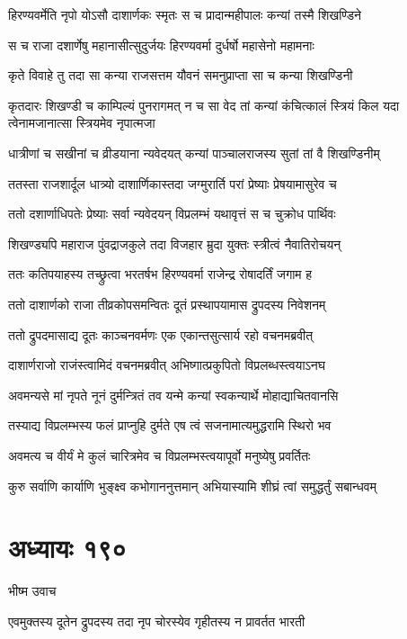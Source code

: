 \twolineshloka
{हिरण्यवर्मेति नृपो योऽसौ दाशार्णकः स्मृतः}
{स च प्रादान्महीपालः कन्यां तस्मै शिखण्डिने}


\twolineshloka
{स च राजा दशार्णेषु महानासीत्सुदुर्जयः}
{हिरण्यवर्मा दुर्धर्षो महासेनो महामनाः}


\twolineshloka
{कृते विवाहे तु तदा सा कन्या राजसत्तम}
{यौवनं समनुप्राप्ता सा च कन्या शिखण्डिनी}


\threelineshloka
{कृतदारः शिखण्डी च काम्पिल्यं पुनरागमत्}
{न च सा वेद तां कन्यां कंचित्कालं स्त्रियं किल}
{यदा त्वेनामजानात्सा स्त्रियमेव नृपात्मजा}


\twolineshloka
{धात्रीणां च सखीनां च व्रीडयाना न्यवेदयत्}
{कन्यां पाञ्चालराजस्य सुतां तां वै शिखण्डिनीम्}


\twolineshloka
{ततस्ता राजशार्दूल धात्र्यो दाशार्णिकास्तदा}
{जग्मुरार्ति परां प्रेष्याः प्रेषयामासुरेव च}


\twolineshloka
{ततो दशार्णाधिपतेः प्रेष्याः सर्वा न्यवेदयन्}
{विप्रलम्भं यथावृत्तं स च चुक्रोध पार्थिवः}


\twolineshloka
{शिखण्ड्यपि महाराज पुंवद्राजकुले तदा}
{विजहार म्रुदा युक्तः स्त्रीत्वं नैवातिरोचयन्}


\twolineshloka
{ततः कतिपयाहस्य तच्छ्रुत्वा भरतर्षभ}
{हिरण्यवर्मा राजेन्द्र रोषादर्तिं जगाम ह}


\twolineshloka
{ततो दाशार्णको राजा तीव्रकोपसमन्वितः}
{दूतं प्रस्थापयामास द्रुपदस्य निवेशनम्}


\twolineshloka
{ततो द्रुपदमासाद्य दूतः काञ्चनवर्मणः}
{एक एकान्तसुत्सार्य रहो वचनमब्रवीत्}


\twolineshloka
{दाशार्णराजो राजंस्त्वामिदं वचनमब्रवीत्}
{अभिष्गात्प्रकुपितो विप्रलब्धस्त्वयाऽनघ}


\twolineshloka
{अवमन्यसे मां नृपते नूनं दुर्मन्त्रितं तव}
{यन्मे कन्यां स्वकन्यार्थे मोहाद्याचितवानसि}


\twolineshloka
{तस्याद्य विप्रलम्भस्य फलं प्राप्नुहि दुर्मते}
{एष त्वं सजनामात्यमुद्धरामि स्थिरो भव}


\twolineshloka
{अवमत्य च वीर्यं मे कुलं चारित्रमेव च}
{विप्रलम्भस्त्वयापूर्वो मनुष्येषु प्रवर्तितः}


\twolineshloka
{कुरु सर्वाणि कार्याणि भुङ्क्ष्व कभोगाननुत्तमान्}
{अभियास्यामि शीघ्रं त्वां समुद्धर्तुं सबान्धवम्}


\chapter{अध्यायः १९०}
\twolineshloka
{भीष्म उवाच}
{}


\twolineshloka
{एवमुक्तस्य दूतेन द्रुपदस्य तदा नृप}
{चोरस्येव गृहीतस्य न प्रावर्तत भारती}


